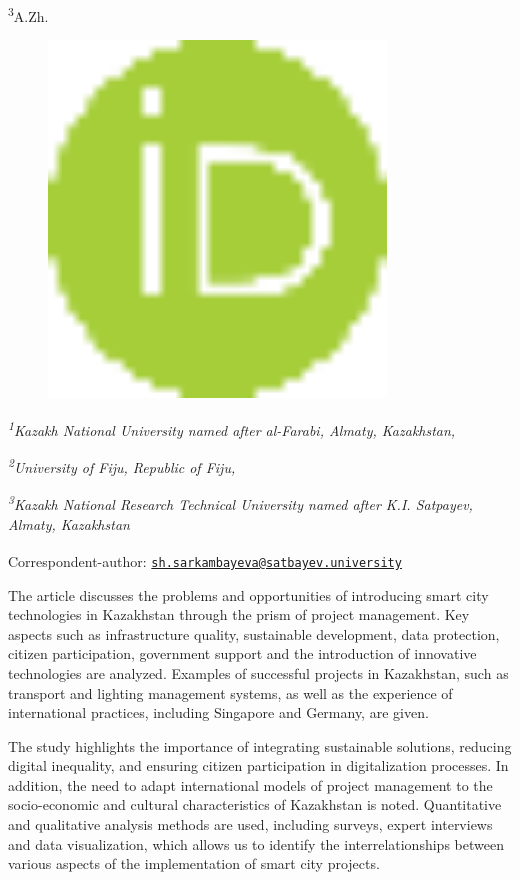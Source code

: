 {\textsuperscript{3}A.Zh.
\begin{figure}[H]
	\centering
	\includegraphics[width=0.8\textwidth]{media/ekon2/image10}
	\caption*{}
\end{figure}


\emph{\textsuperscript{1}Kazakh National University named after
al-Farabi, Almaty, Kazakhstan,}

\emph{\textsuperscript{2}University of Fiju, Republic of Fiju,}

\emph{\textsuperscript{3}Kazakh National Research Technical University
named after K.I. Satpayev, Almaty, Kazakhstan}

{\bfseries \textsuperscript{\envelope }}Correspondent-author:
\href{mailto:sh.sarkambayeva@satbayev.university}{\nolinkurl{sh.sarkambayeva@satbayev.university}}

The article discusses the problems and opportunities of introducing
smart city technologies in Kazakhstan through the prism of project
management. Key aspects such as infrastructure quality, sustainable
development, data protection, citizen participation, government support
and the introduction of innovative technologies are analyzed. Examples
of successful projects in Kazakhstan, such as transport and lighting
management systems, as well as the experience of international
practices, including Singapore and Germany, are given.

The study highlights the importance of integrating sustainable
solutions, reducing digital inequality, and ensuring citizen
participation in digitalization processes. In addition, the need to
adapt international models of project management to the socio-economic
and cultural characteristics of Kazakhstan is noted. Quantitative and
qualitative analysis methods are used, including surveys, expert
interviews and data visualization, which allows us to identify the
interrelationships between various aspects of the implementation of
smart city projects.

}
